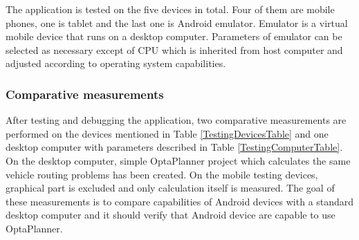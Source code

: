 The application is tested on the five devices in total. Four of them are mobile phones, one is tablet and the last one
is Android emulator. Emulator is a virtual mobile device that runs on a desktop computer. Parameters of emulator can be
selected as necessary except of CPU which is inherited from host computer and adjusted according to operating system
capabilities.

\begin{table}[h!]
    \centering
    \caption{Configurations of testing devices.}
    \label{TestingDevicesTable}
\end{table}

\subsubsection{Comparative measurements}
After testing and debugging the application, two comparative measurements are performed on the devices mentioned in
Table \ref{TestingDevicesTable} and one desktop computer with parameters described in Table \ref{TestingComputerTable}.
On the desktop computer, simple OptaPlanner project which calculates the same vehicle routing problems has been created.
On the mobile testing devices, graphical part is excluded and only calculation itself is measured. The goal of these
measurements is to compare capabilities of Android devices with a standard desktop computer and it should verify that
Android device are capable to use OptaPlanner.

